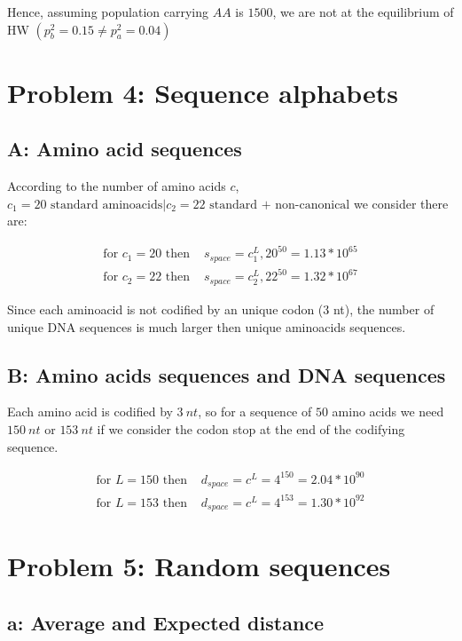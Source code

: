 Hence, assuming population carrying $AA$ is $1500$, we are not at the equilibrium of HW $(p^{2}_b = 0.15 \neq p^{2}_a = 0.04)$

\setcounter{chapter}{4}
\setcounter{section}{0}
\section{Problem 4: Sequence alphabets}

\subsection{A: Amino acid sequences}

According to the number of amino acids $c$, $c_1 = 20 \text{ standard aminoacids} | c_2 = 22 \text{ standard + non-canonical}$ we consider there are:

\begin{align}
\text{for } c_1 = 20 \text{ then } &s_{space} = c_1^L, 20^{50} = 1.13*10^{65}\\
\text{for } c_2 = 22 \text{ then } &s_{space} = c_2^L, 22^{50} = 1.32*10^{67}
\end{align}

Since each aminoacid is not codified by an unique codon (3 nt), the number of unique DNA sequences is much larger then unique aminoacids sequences.


\subsection{B: Amino acids sequences and DNA sequences}

Each amino acid is codified by $3~nt$, so for a sequence of $50$ amino acids we need $150~nt$ or $153~nt$ if we consider the codon stop at the end of the codifying sequence.

\begin{align}
\text{for } L = 150 \text{ then } &d_{space} = c^L =  4^{150} = 2.04*10^{90}\\
\text{for } L = 153 \text{ then } &d_{space} = c^L =  4^{153} = 1.30*10^{92}
\end{align}

\setcounter{chapter}{5}
\setcounter{section}{0}
\section{Problem 5: Random sequences}

\subsection{a: Average and Expected distance}

